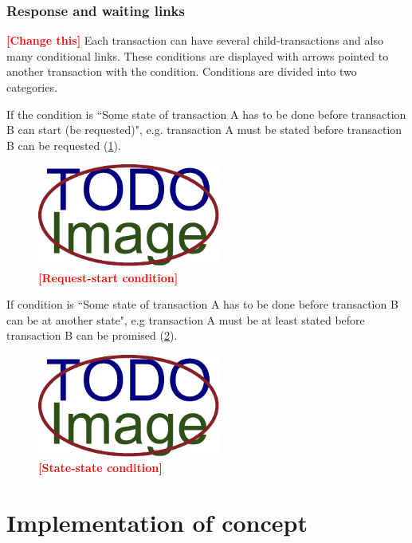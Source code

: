 \documentclass[thesis=B,english]{FITthesis}[2012/06/26]
\newcommand{\todo}[1]{\textcolor{red}{\textbf{[#1]}}}
\begin{document}
    \subsection{Response and waiting links}
    \todo{Change this}
   Each transaction can have several child-transactions and also many conditional links. These conditions are displayed with arrows pointed to another transaction with the condition.
Conditions are divided into two categories.

If the condition is ``Some state of transaction A has to be done before transaction B can start (be requested)", e.g. transaction A must be stated before transaction B can be requested (\cref{fig:request-start-condition}).

	 \begin{figure}
          \centering
          \includegraphics[width=6cm,keepaspectratio]{img/TODO-image}
          \caption{\todo{Request-start condition}}
          \label{fig:request-start-condition}
      \end{figure}  

If condition is ``Some state of transaction A has to be done before transaction B can be at another state", e.g transaction A must be at least stated before transaction B can be promised (\cref{fig:state-state-condition}).

	 \begin{figure}
          \centering
          \includegraphics[width=6cm,keepaspectratio]{img/TODO-image}
          \caption{\todo{State-state condition}}
           \label{fig:state-state-condition}
      \end{figure}  


\chapter{Implementation of concept}
\end{document}
